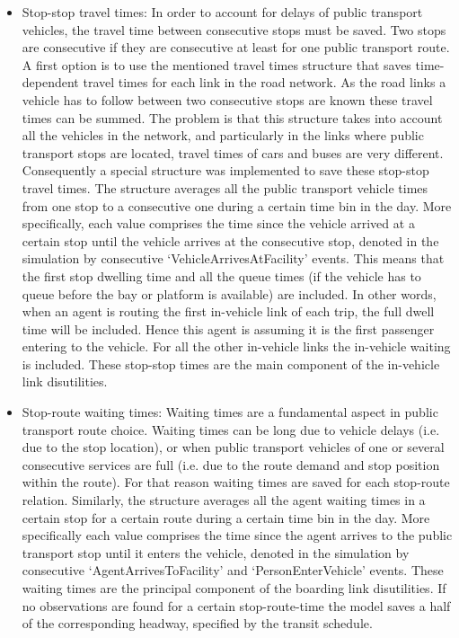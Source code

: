 \begin{itemize}

\item Stop-stop travel times: In order to account for delays of public transport vehicles, the travel time between consecutive stops must be saved. Two stops are consecutive if they are consecutive at least for one public transport route. A first option is to use the mentioned travel times structure that saves time-dependent travel times for each link in the road network. As the road links a vehicle has to follow between two consecutive stops are known these travel times can be summed. The problem is that this structure takes into account all the vehicles in the network, and particularly in the links where public transport stops are located, travel times of cars and buses are very different. Consequently a special structure was implemented to save these stop-stop travel times. The structure averages all the public transport vehicle times from one stop to a consecutive one during a certain time bin in the day. More specifically, each value comprises the time since the vehicle arrived at a certain stop until the vehicle arrives at the consecutive stop, denoted in the simulation by consecutive `VehicleArrivesAtFacility' events. This means that the first stop dwelling time and all the queue times (if the vehicle has to queue before the bay or platform is available) are included. In other words, when an agent is routing the first in-vehicle link of each trip, the full dwell time will be included. Hence this agent is assuming it is the first passenger entering to the vehicle. For all the other in-vehicle links the in-vehicle waiting is included. These stop-stop times are the main component of the in-vehicle link disutilities.

\item Stop-route waiting times: Waiting times are a fundamental aspect in public transport route choice. Waiting times can be long due to vehicle delays (i.e. due to the stop location), or when public transport vehicles of one or several consecutive services are full (i.e. due to the route demand and stop position within the route). For that reason waiting times are saved for each stop-route relation. Similarly, the structure averages all the agent waiting times in a certain stop for a certain route during a certain time bin in the day. More specifically each value comprises the time since the agent arrives to the public transport stop until it enters the vehicle, denoted in the simulation by consecutive `AgentArrivesToFacility' and `PersonEnterVehicle' events. These waiting times are the principal component of the boarding link disutilities. If no observations are found for a certain stop-route-time the model saves a half of the corresponding headway, specified by the transit schedule.


\end{itemize}
